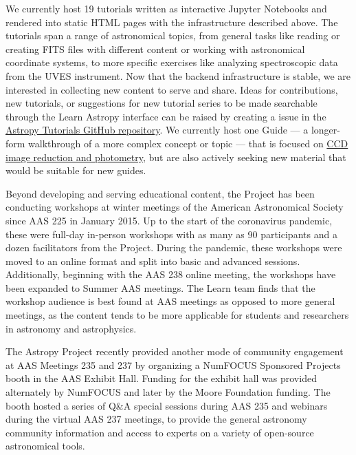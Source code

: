 \documentclass[modern]{aastex631}
\begin{document}
We currently host 19 tutorials written as interactive Jupyter Notebooks and
rendered into static HTML pages with the infrastructure described above.
The tutorials span a range of astronomical topics, from general tasks like
reading or creating FITS files with different content or working with
astronomical coordinate systems, to more specific exercises like analyzing
spectroscopic data from the UVES instrument.
Now that the backend infrastructure is stable, we are interested in collecting
new content to serve and share.
Ideas for contributions, new tutorials, or suggestions for new tutorial series
to be made searchable through the Learn Astropy interface can be raised by
creating a \github issue in the
\href{https://github.com/astropy/astropy-tutorials}{Astropy Tutorials GitHub
repository}.
We currently host one Guide --- a longer-form walkthrough of a more complex
concept or topic --- that is focused on
\href{http://www.astropy.org/ccd-reduction-and-photometry-guide}{CCD image
reduction and photometry}, but are also actively seeking new material that would
be suitable for new guides.

Beyond developing and serving educational content, the \astropy Project has been
conducting workshops at winter meetings of the American Astronomical Society
since AAS 225 in January 2015.
Up to the start of the coronavirus pandemic, these were full-day in-person
workshops with as many as 90 participants and a dozen facilitators from the
Project.
During the pandemic, these workshops were moved to an online format and split
into basic and advanced sessions.
Additionally, beginning with the AAS 238 online meeting, the workshops have been
expanded to Summer AAS meetings.
The Learn team finds that the workshop audience is best found at AAS meetings as
opposed to more general \python meetings, as the content tends to be more
applicable for students and researchers in astronomy and astrophysics.

The Astropy Project recently provided another mode of community engagement at
AAS Meetings 235 and 237 by organizing a NumFOCUS Sponsored Projects booth in
the AAS Exhibit Hall.
Funding for the exhibit hall was provided alternately by NumFOCUS and later by
the Moore Foundation funding.
The booth hosted a series of Q\&A special sessions during AAS 235 and webinars
during the virtual AAS 237 meetings, to provide the general astronomy community
information and access to experts on a variety of open-source astronomical
tools.

\end{document}
